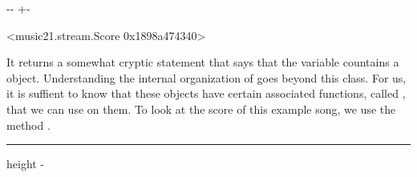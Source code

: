 \documentclass[letterpaper,10pt,english]{sphinxmanual}
\newlength\nbsphinxcodecellspacing
\begin{document}
{
\begin{sphinxVerbatim}[commandchars=\\\{\}]
\llap{\color{nbsphinxin}[8]:\,\hspace{\fboxrule}\hspace{\fboxsep}}
\end{sphinxVerbatim}
}

{

\kern-\sphinxverbatimsmallskipamount\kern-\baselineskip
\kern+\FrameHeightAdjust\kern-\fboxrule
\vspace{\nbsphinxcodecellspacing}

\begin{sphinxVerbatim}[commandchars=\\\{\}]
\llap{\color{nbsphinxout}[8]:\,\hspace{\fboxrule}\hspace{\fboxsep}}<music21.stream.Score 0x1898a474340>
\end{sphinxVerbatim}
}

It returns a somewhat cryptic statement that says that the variable countains a  object. Understanding the internal organization of  goes beyond this class. For us, it is suffient to know that these objects have certain associated functions, called , that we can use on them. To look at the score of this example song, we use the method .

{
\begin{sphinxVerbatim}[commandchars=\\\{\}]
\llap{\color{nbsphinxin}[9]:\,\hspace{\fboxrule}\hspace{\fboxsep}}
\end{sphinxVerbatim}
}

\hrule height -\fboxrule\relax
\vspace{\nbsphinxcodecellspacing}

\makeatletter\setbox\nbsphinxpromptbox\box\voidb@x\makeatother
\end{document}
